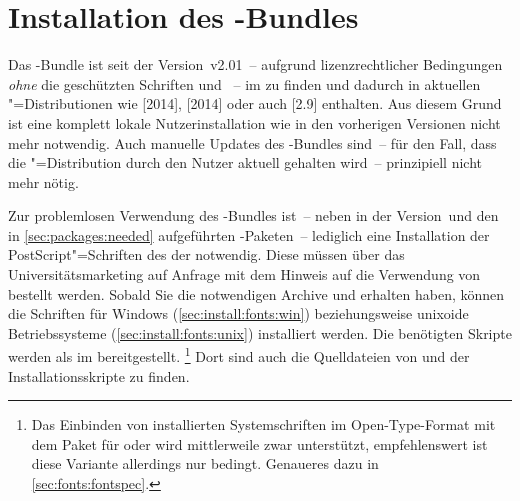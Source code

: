 \section{Installation des \TUDScript-Bundles}
\label{sec:install}%
%
%
%
Das \TUDScript-Bundle ist seit der Version~v2.01~-- aufgrund lizenzrechtlicher 
Bedingungen \emph{ohne} die geschützten Schriften \Univers und \DIN~-- im 
\foreignlanguage{english}{%
} zu finden und dadurch in aktuellen "=Distributionen wie 
[2014], [2014] 
oder auch [2.9] enthalten. Aus diesem Grund ist 
eine komplett lokale Nutzerinstallation wie in den vorherigen Versionen nicht 
mehr notwendig. Auch manuelle Updates des \TUDScript-Bundles sind~-- für den 
Fall, dass die "=Distribution durch den Nutzer aktuell gehalten 
wird~-- prinzipiell nicht mehr nötig.

Zur problemlosen Verwendung des \TUDScript-Bundles ist~-- neben \KOMAScript{} in
der Version~\vKOMAScript und den in \autoref{sec:packages:needed} aufgeführten 
-Paketen~-- lediglich eine Installation der PostScript"=Schriften 
des \CDs der \TnUD notwendig. Diese müssen über das Universitätsmarketing auf 
%
{Anfrage} mit dem Hinweis auf die Verwendung von  bestellt 
werden. Sobald Sie die notwendigen Archive  und 
 erhalten haben, können die Schriften für Windows 
(\autoref{sec:install:fonts:win}) beziehungsweise unixoide Betriebssysteme 
(\autoref{sec:install:fonts:unix}) installiert werden. Die benötigten Skripte 
werden als  
im \GitHubRepo* bereitgestellt.%
\footnote{%
  Das Einbinden von installierten Systemschriften im Open-Type-Format mit dem 
  Paket  für  oder  wird 
  mittlerweile zwar unterstützt, empfehlenswert ist diese Variante allerdings 
  nur bedingt. Genaueres dazu in \autoref{sec:fonts:fontspec}.%
}
Dort sind auch die Quelldateien von \TUDScript und der Installationsskripte zu 
finden.


